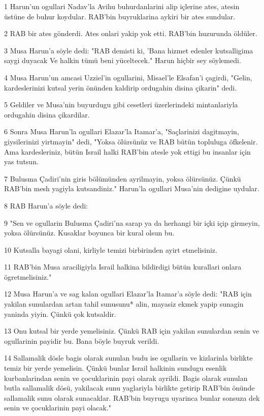 \par 1 Harun'un ogullari Nadav'la Avihu buhurdanlarini alip içlerine ates, atesin üstüne de buhur koydular. RAB'bin buyruklarina aykiri bir ates sundular.
\par 2 RAB bir ates gönderdi. Ates onlari yakip yok etti. RAB'bin huzurunda öldüler.
\par 3 Musa Harun'a söyle dedi: "RAB demisti ki, 'Bana hizmet edenler kutsalligima saygi duyacak Ve halkin tümü beni yüceltecek." Harun hiçbir sey söylemedi.
\par 4 Musa Harun'un amcasi Uzziel'in ogullarini, Misael'le Elsafan'i çagirdi, "Gelin, kardeslerinizi kutsal yerin önünden kaldirip ordugahin disina çikarin" dedi.
\par 5 Geldiler ve Musa'nin buyurdugu gibi cesetleri üzerlerindeki mintanlariyla ordugahin disina çikardilar.
\par 6 Sonra Musa Harun'la ogullari Elazar'la Itamar'a, "Saçlarinizi dagitmayin, giysilerinizi yirtmayin" dedi, "Yoksa ölürsünüz ve RAB bütün topluluga öfkelenir. Ama kardesleriniz, bütün Israil halki RAB'bin atesle yok ettigi bu insanlar için yas tutsun.
\par 7 Bulusma Çadiri'nin giris bölümünden ayrilmayin, yoksa ölürsünüz. Çünkü RAB'bin mesh yagiyla kutsandiniz." Harun'la ogullari Musa'nin dedigine uydular.
\par 8 RAB Harun'a söyle dedi:
\par 9 "Sen ve ogullarin Bulusma Çadiri'na sarap ya da herhangi bir içki içip girmeyin, yoksa ölürsünüz. Kusaklar boyunca bir kural olsun bu.
\par 10 Kutsalla bayagi olani, kirliyle temizi birbirinden ayirt etmelisiniz.
\par 11 RAB'bin Musa araciligiyla Israil halkina bildirdigi bütün kurallari onlara ögretmelisiniz."
\par 12 Musa Harun'a ve sag kalan ogullari Elazar'la Itamar'a söyle dedi: "RAB için yakilan sunulardan artan tahil sunusunu* alin, mayasiz ekmek yapip sunagin yaninda yiyin. Çünkü çok kutsaldir.
\par 13 Onu kutsal bir yerde yemelisiniz. Çünkü RAB için yakilan sunulardan senin ve ogullarinin payidir bu. Bana böyle buyruk verildi.
\par 14 Sallamalik dösle bagis olarak sunulan budu ise ogullarin ve kizlarinla birlikte temiz bir yerde yemelisin. Çünkü bunlar Israil halkinin sundugu esenlik kurbanlarindan senin ve çocuklarinin payi olarak ayrildi. Bagis olarak sunulan butla sallamalik dösü, yakilacak sunu yaglariyla birlikte getirip RAB'bin önünde sallamalik sunu olarak sunacaklar. RAB'bin buyrugu uyarinca bunlar sonsuza dek senin ve çocuklarinin payi olacak."
